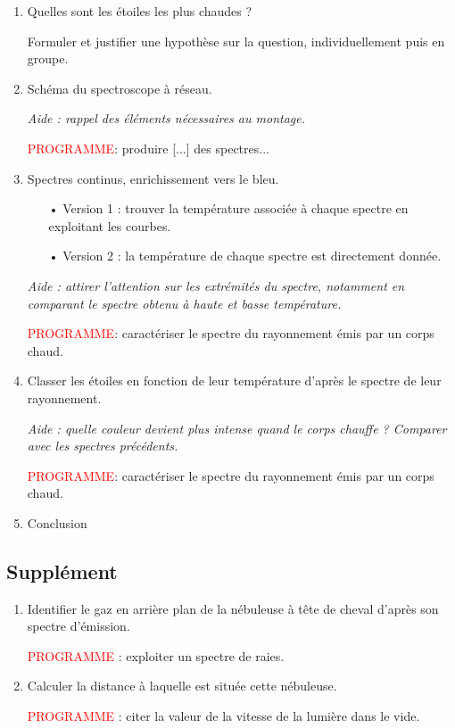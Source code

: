 \documentclass[12pt,a4paper,fleqn]{article}
\newcommand{\prog}{\textcolor{red}{PROGRAMME}}
\begin{document}
\begin{enumerate}
\item \anarai{}

Quelles sont les étoiles les plus chaudes ?

Formuler et justifier une hypothèse sur la question, individuellement puis en groupe.

\item \rea{}

Schéma du spectroscope à réseau.

\textit{Aide : rappel des éléments nécessaires au montage.}

\prog : produire [...] des spectres...

\item \app{} \anarai{}

Spectres continus, enrichissement vers le bleu.
\begin{itemize}
\item[•] Version 1 : trouver la température associée à chaque spectre en exploitant les courbes.
\item[•] Version 2 : la température de chaque spectre est directement donnée.
\end{itemize}

\textit{Aide : attirer l'attention sur les extrémités du spectre, notamment en comparant le spectre obtenu à haute et \og basse \fg{}  température.}

\prog : caractériser le spectre du rayonnement émis par un corps chaud.

\item \anarai{}

Classer les étoiles en fonction de leur température d'après le spectre de leur rayonnement.

\textit{Aide : quelle couleur devient plus intense quand le corps chauffe ? Comparer avec les spectres précédents.}

\prog : caractériser le spectre du rayonnement émis par un corps chaud.

\item \val{}

Conclusion
\end{enumerate}

\subsection*{Supplément}

\begin{enumerate}[resume]
\item \app{} \anarai{}

Identifier le gaz  en arrière plan de la nébuleuse à tête de cheval d'après son spectre d'émission.

\prog{} : exploiter un spectre de raies.

\item \rco{} \rea{}

Calculer la distance à laquelle est située cette nébuleuse.

\prog{} : citer la valeur de la vitesse de la lumière dans le vide.
\end{enumerate}
\end{document}
